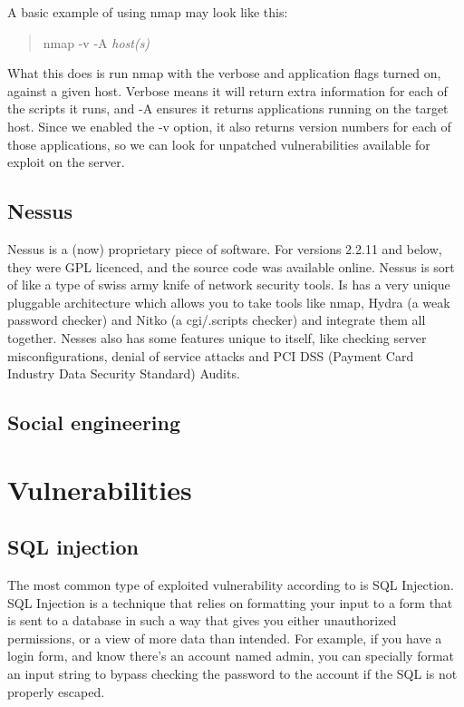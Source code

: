 \documentclass{article}
\begin{document}
A basic example of using nmap may look like this:

\begin{quote}
    nmap -v -A \textit{host(s)}
\end{quote}

What this does is run nmap with the verbose and application flags turned on,
against a given host. Verbose means it will return extra information for each 
of the scripts it runs, and -A ensures it returns applications running on the
target host. Since we enabled the -v option, it also returns version numbers
for each of those applications, so we can look for unpatched vulnerabilities
available for exploit on the server.

\subsection{Nessus}

Nessus is a (now) proprietary piece of software. For versions 2.2.11 and below,
they were GPL licenced, and the source code was available online. Nessus is
sort of like a type of swiss army knife of network security tools. Is has
a very unique pluggable architecture which allows you to take tools like
nmap, Hydra (a weak password checker) and Nitko (a cgi/.scripts checker) and
integrate them all together. Nesses also has some features unique to itself,
like checking server misconfigurations, denial of service attacks and
PCI DSS (Payment Card Industry Data Security Standard) Audits.

\subsection{Social engineering}

\section{Vulnerabilities}

\subsection{SQL injection}

The most common type of exploited vulnerability according to
\cite{mostcommonvulnerability} is SQL Injection. SQL Injection is a technique
that relies on formatting your input to a form that is sent to a database in
such a way that gives you either unauthorized permissions, or a view of more
data than intended. For example, if you have a login form, and know there's
an account named admin, you can specially format an input string to bypass
checking the password to the account if the SQL is not properly escaped.
\end{document}
